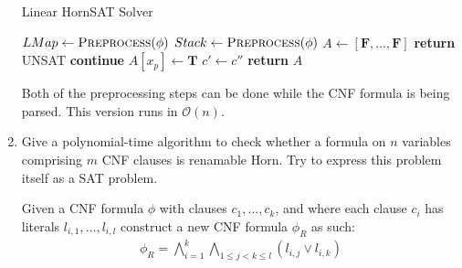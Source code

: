 \begin{enumerate}[label=(\alph*)]
    \begin{algorithm}[H]
      \caption{Linear HornSAT Solver}
      \begin{algorithmic}[1]
           
              \State $LMap\gets \Call{Preprocess}{\phi}$ 
              \State $Stack\gets \Call{Preprocess}{\phi}$ 
              \State $A\gets [\mathbf{F}, \dots, \mathbf{F}]$
               
                  \State \textbf{return} UNSAT
                  \State \textbf{continue}
                  \State $A[x_p] \gets \mathbf{T}$
                    \State $c' \gets c''$ 
                    \EndIf
                  \EndFor
                \EndIf
              \EndWhile
              \State \textbf{return} $A$
          \EndProcedure
      \end{algorithmic}
    \end{algorithm}

    Both of the preprocessing steps can be done while the CNF formula is being parsed. This version runs in $\mathcal{O}(n)$.

  \item {\color{blue} Give a polynomial-time algorithm to check whether a formula on $n$ variables comprising $m$ CNF clauses is renamable Horn. Try to express this problem itself as a SAT problem.}

    Given a CNF formula $\phi$ with clauses $c_1, \dots, c_k$, and where each clause $c_i$ has literals $l_{i,1}, \dots, l_{i,l}$ construct a new CNF formula $\phi_R$ as such:
    \begin{align*}
      \phi_R = \bigwedge_{i=1}^k \bigwedge_{1 \leq j < k \leq l} (l_{i,j} \lor l_{i,k})
    \end{align*}


\end{enumerate}
